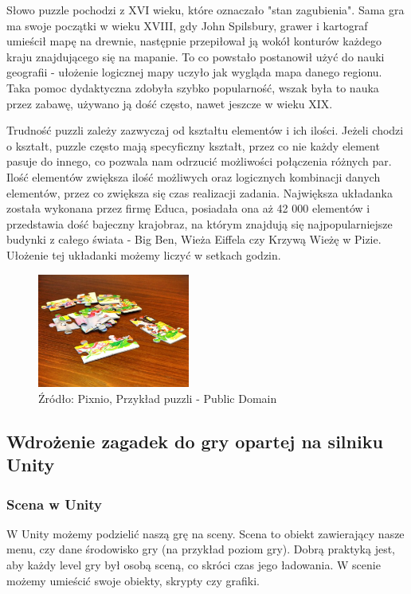 \documentclass[oneside,polski,logo]{amuthesis}
\begin{document}
Słowo puzzle pochodzi z XVI wieku, które oznaczało "stan zagubienia". Sama gra ma swoje początki w wieku XVIII, gdy John Spilsbury, grawer i kartograf umieścił mapę na drewnie, następnie przepiłował ją wokół konturów każdego kraju znajdującego się na mapanie. To co powstało postanowił użyć do nauki geografii - ułożenie logicznej mapy uczyło jak wygląda mapa danego regionu. Taka pomoc dydaktyczna zdobyła szybko popularność, wszak była to nauka przez zabawę, używano ją dość często, nawet jeszcze w wieku XIX.  

Trudność puzzli zależy zazwyczaj od kształtu elementów i ich ilości. Jeżeli chodzi o kształt, puzzle często mają specyficzny kształt, przez co nie każdy element pasuje do innego, co pozwala nam odrzucić możliwości połączenia różnych par. Ilość elementów zwiększa ilość możliwych oraz logicznych kombinacji danych elementów, przez co zwiększa się czas realizacji zadania. Największa układanka została wykonana przez firmę Educa, posiadała ona aż 42 000 elementów i przedstawia dość bajeczny krajobraz, na którym znajdują się najpopularniejsze budynki z całego świata - Big Ben, Wieża Eiffela czy Krzywą Wieżę w Pizie. Ułożenie tej układanki możemy liczyć w setkach godzin. \cite{puzzle}

\begin{figure}[h]
	\centering
	\includegraphics[width=5cm]{images/tyrek/puzzle.jpg}
	\caption{Źródło: Pixnio, Przykład puzzli - Public Domain}
\end{figure}

\subsection{Wdrożenie zagadek do gry opartej na silniku Unity}
\subsubsection{Scena w Unity}
W Unity możemy podzielić naszą grę na sceny. Scena to obiekt zawierający nasze menu, czy dane środowisko gry (na przykład poziom gry). Dobrą praktyką jest, aby każdy level gry był osobą sceną, co skróci czas jego ładowania. W scenie możemy umieścić swoje obiekty, skrypty czy grafiki. \cite{scena}
\end{document}
